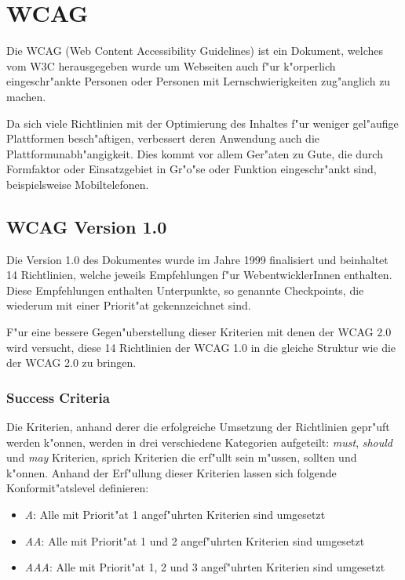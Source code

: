 \documentclass[a4paper,bibtotoc,oneside]{scrbook}
\begin{document}
\chapter{WCAG}
Die WCAG (Web Content Accessibility Guidelines) ist ein Dokument, welches vom W3C herausgegeben wurde um Webseiten auch f"ur k"orperlich eingeschr"ankte Personen oder Personen mit Lernschwierigkeiten zug"anglich zu machen. 

Da sich viele Richtlinien mit der Optimierung des Inhaltes f"ur weniger gel"aufige Plattformen besch"aftigen, verbessert deren Anwendung auch die Plattformunabh"angigkeit. Dies kommt vor allem Ger"aten zu Gute, die durch Formfaktor oder Einsatzgebiet in Gr"o"se oder Funktion eingeschr"ankt sind, beispielsweise Mobiltelefonen. \cite[Abschnitt Abstract]{wcag1}


\section{WCAG Version 1.0}
Die Version 1.0 des Dokumentes wurde im Jahre 1999 finalisiert und beinhaltet 14 Richtlinien, welche jeweils Empfehlungen f"ur WebentwicklerInnen enthalten. Diese Empfehlungen enthalten Unterpunkte, so genannte Checkpoints, die wiederum mit einer Priorit"at gekennzeichnet sind. \cite[Abschnitt Abstract]{wcag1}

F"ur eine bessere Gegen"uberstellung dieser Kriterien mit denen der WCAG 2.0 wird versucht, diese 14 Richtlinien der WCAG 1.0 in die gleiche Struktur wie die der WCAG 2.0 zu bringen.

\subsection{Success Criteria}
Die Kriterien, anhand derer die erfolgreiche Umsetzung der Richtlinien gepr"uft werden k"onnen, werden in drei verschiedene Kategorien aufgeteilt: \emph{must}, \emph{should} und \emph{may} Kriterien, sprich Kriterien die erf"ullt sein m"ussen, sollten und k"onnen. Anhand der Erf"ullung dieser Kriterien lassen sich folgende Konformit"atslevel definieren: \cite[Abschnitt 4]{wcag1}

\begin{itemize}
\item \emph{A}: Alle mit Priorit"at 1 angef"uhrten Kriterien sind umgesetzt
\item \emph{AA}: Alle mit Priorit"at 1 und 2 angef"uhrten Kriterien sind umgesetzt
\item \emph{AAA}: Alle mit Priorit"at 1, 2 und 3 angef"uhrten Kriterien sind umgesetzt
\end{itemize}
\end{document}
